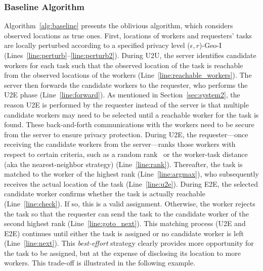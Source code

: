 \documentclass{USC-Thesis}
\numberwithin{equation}{chapter}
\begin{document}
\subsubsection{Baseline Algorithm}
\label{sec:baseline}

Algorithm~\ref{alg:baseline} presents the oblivious algorithm, which considers observed locations as true ones. First, locations of workers and requesters' tasks are locally perturbed according to a specified privacy level ($\epsilon,r$)-Geo-I~\cite{andres2013geo} (Lines~\ref{line:perturb}--\ref{line:perturb2}). During U2U, the server identifies candidate workers for each task such that the observed location of the task is reachable from the observed locations of the workers (Line~\ref{line:reachable_workers}). The server then forwards the candidate workers to the requester, who performs the U2E phase (Line~\ref{line:forward}). As mentioned in Section~\ref{sec:system2}, the reason U2E is performed by the requester instead of the server is that multiple candidate workers may need to be selected until a reachable worker for the task is found. These back-and-forth communications with the workers need to be secure from the server to ensure privacy protection.
During U2E, the requester---once receiving the candidate workers from the server---ranks those workers with respect to certain criteria, such as a random rank~\cite{karp1990optimal}
or the worker-task distance (aka the nearest-neighbor strategy) (Line~\ref{line:rank}). Thereafter, the task is matched to the worker of the highest rank (Line~\ref{line:argmax}), who subsequently receives the actual location of the task (Line~\ref{line:u2e}).
During E2E, the selected candidate worker confirms whether the task is actually reachable (Line~\ref{line:check}). If so, this is a valid assignment. Otherwise, the worker rejects the task so that the requester can send the task to the candidate worker of the second highest rank (Line~\ref{line:goto_next}). This matching process (U2E and E2E) continues until either the task is assigned or no candidate worker is left (Line~\ref{line:next}). This \emph{best-effort} strategy clearly provides more opportunity for the task to be assigned, but at the expense of disclosing its location to more workers. This trade-off is illustrated in the following example.
\end{document}
